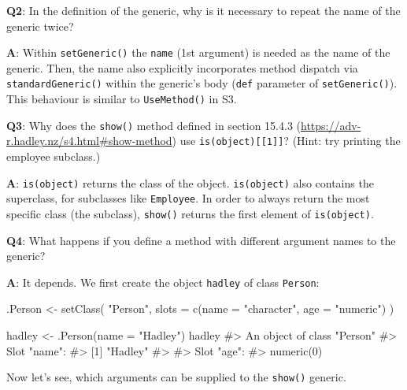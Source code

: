 \documentclass[
]{krantz}
\makeatletter
\newenvironment{Shaded}{\begin{snugshade}}{\end{snugshade}}
\newcommand{\CommentTok}[1]{\textcolor[rgb]{0.56,0.35,0.01}{\textit{#1}}}
\newcommand{\DataTypeTok}[1]{\textcolor[rgb]{0.13,0.29,0.53}{#1}}
\newcommand{\KeywordTok}[1]{\textcolor[rgb]{0.13,0.29,0.53}{\textbf{#1}}}
\newcommand{\NormalTok}[1]{#1}
\newcommand{\StringTok}[1]{\textcolor[rgb]{0.31,0.60,0.02}{#1}}
\renewcommand{\href}[2]{#2 (\url{#1})}
\newenvironment{kframe}{%
\medskip{}
\setlength{\fboxsep}{.8em}
 \def\at@end@of@kframe{}%
 \ifinner\ifhmode%
  \def\at@end@of@kframe{\end{minipage}}%
  \begin{minipage}{\columnwidth}%
 \fi\fi%
 \def\FrameCommand##1{\hskip\@totalleftmargin \hskip-\fboxsep
 \colorbox{shadecolor}{##1}\hskip-\fboxsep
     \hskip-\linewidth \hskip-\@totalleftmargin \hskip\columnwidth}%
 \MakeFramed {\advance\hsize-\width
   \@totalleftmargin\z@ \linewidth\hsize
   \@setminipage}}%
 {\par\unskip\endMakeFramed%
 \at@end@of@kframe}
\renewenvironment{Shaded}{\begin{kframe}}{\end{kframe}}
\renewcommand{\KeywordTok} [1]{\textcolor[rgb]{0.00,0.44,0.13}{{#1}}}
\renewcommand{\DataTypeTok}[1]{\textcolor[rgb]{0.56,0.13,0.00}{{#1}}}
\renewcommand{\StringTok}  [1]{\textcolor[rgb]{0.25,0.44,0.63}{{#1}}}
\renewcommand{\CommentTok} [1]{\textcolor[rgb]{0.38,0.63,0.69}{{#1}}}
\renewcommand{\NormalTok}  [1]{{#1}}
\makeatother
\begin{document}
\textbf{{Q2}}: In the definition of the generic, why is it necessary to repeat the name of the generic twice?

\textbf{{A}}: Within \texttt{setGeneric()} the \texttt{name} (1st argument) is needed as the name of the generic. Then, the name also explicitly incorporates method dispatch via \texttt{standardGeneric()} within the generic's body (\texttt{def} parameter of \texttt{setGeneric()}). This behaviour is similar to \texttt{UseMethod()} in S3.

\textbf{{Q3}}: Why does the \texttt{show()} method defined in section \href{https://adv-r.hadley.nz/s4.html\#show-method}{15.4.3} use \texttt{is(object){[}{[}1{]}{]}}? (Hint: try printing the employee subclass.)

\textbf{{A}}: \texttt{is(object)} returns the class of the object. \texttt{is(object)} also contains the superclass, for subclasses like \texttt{Employee}. In order to always return the most specific class (the subclass), \texttt{show()} returns the first element of \texttt{is(object)}.

\textbf{{Q4}}: What happens if you define a method with different argument names to the generic?

\textbf{{A}}: It depends. We first create the object \texttt{hadley} of class \texttt{Person}:

\begin{Shaded}
\begin{Highlighting}[]
\NormalTok{.Person <-}\StringTok{ }\KeywordTok{setClass}\NormalTok{(}
  \StringTok{"Person"}\NormalTok{, }
  \DataTypeTok{slots =} \KeywordTok{c}\NormalTok{(}\DataTypeTok{name =} \StringTok{"character"}\NormalTok{, }\DataTypeTok{age =} \StringTok{"numeric"}\NormalTok{)}
\NormalTok{)}

\NormalTok{hadley <-}\StringTok{ }\KeywordTok{.Person}\NormalTok{(}\DataTypeTok{name =} \StringTok{"Hadley"}\NormalTok{)}
\NormalTok{hadley}
\CommentTok{#> An object of class "Person"}
\CommentTok{#> Slot "name":}
\CommentTok{#> [1] "Hadley"}
\CommentTok{#> }
\CommentTok{#> Slot "age":}
\CommentTok{#> numeric(0)}
\end{Highlighting}
\end{Shaded}

Now let's see, which arguments can be supplied to the \texttt{show()} generic.

\begin{Shaded}
\end{Shaded}
\end{document}

